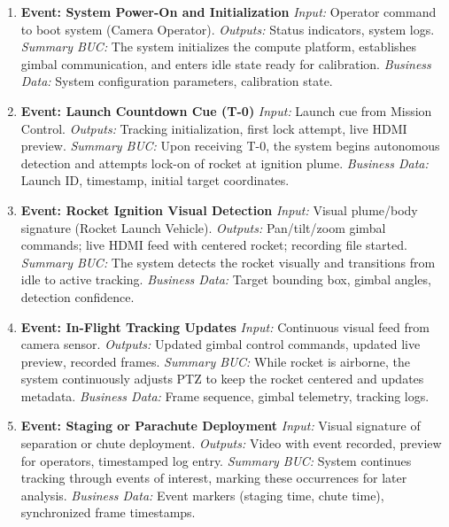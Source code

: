 \documentclass[12pt]{article}
\begin{document}
\begin{enumerate}[wide=0pt, leftmargin=*]

  \item \textbf{Event: System Power-On and Initialization}
        \emph{Input:} Operator command to boot system (Camera Operator).
        \emph{Outputs:} Status indicators, system logs.
        \emph{Summary BUC:} The system initializes the compute platform,
        establishes gimbal communication, and enters idle state ready for
        calibration.
        \emph{Business Data:} System configuration parameters, calibration state.

  \item \textbf{Event: Launch Countdown Cue (T-0)}
        \emph{Input:} Launch cue from Mission Control.
        \emph{Outputs:} Tracking initialization, first lock attempt, live HDMI preview.
        \emph{Summary BUC:} Upon receiving T-0, the system begins autonomous
        detection and attempts lock-on of rocket at ignition plume.
        \emph{Business Data:} Launch ID, timestamp, initial target coordinates.

  \item \textbf{Event: Rocket Ignition Visual Detection}
        \emph{Input:} Visual plume/body signature (Rocket Launch Vehicle).
        \emph{Outputs:} Pan/tilt/zoom gimbal commands; live HDMI feed with
        centered rocket; recording file started.
        \emph{Summary BUC:} The system detects the rocket visually and
        transitions from idle to active tracking.
        \emph{Business Data:} Target bounding box, gimbal angles, detection confidence.

  \item \textbf{Event: In-Flight Tracking Updates}
        \emph{Input:} Continuous visual feed from camera sensor.
        \emph{Outputs:} Updated gimbal control commands, updated live preview,
        recorded frames.
        \emph{Summary BUC:} While rocket is airborne, the system continuously
        adjusts PTZ to keep the rocket centered and updates metadata.
        \emph{Business Data:} Frame sequence, gimbal telemetry, tracking logs.

  \item \textbf{Event: Staging or Parachute Deployment}
        \emph{Input:} Visual signature of separation or chute deployment.
        \emph{Outputs:} Video with event recorded, preview for operators,
        timestamped log entry.
        \emph{Summary BUC:} System continues tracking through events of
        interest, marking these occurrences for later analysis.
        \emph{Business Data:} Event markers (staging time, chute time),
        synchronized frame timestamps.


\end{enumerate}
\end{document}
